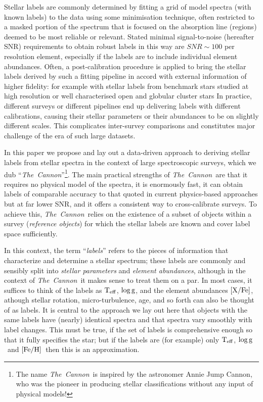 \documentclass[12pt, preprint]{aastex}
\newcommand{\tc}{\textsl{The~Cannon}}
\newcommand{\teff}{\mbox{$\rm T_{eff}$}}
\newcommand{\feh}{\mbox{$\rm [Fe/H]$}}
\newcommand{\xfe}{\mbox{$\rm [X/Fe]$}}
\newcommand{\logg}{\mbox{$\rm \log g$}}
\begin{document}
Stellar labels are commonly determined by fitting a grid of model spectra (with known labels) to the data using some minimisation technique, often restricted to a masked portion of the spectrum that is focused on the absorption line (regions) deemed to be most reliable or relevant. 
Stated minimal signal-to-noise (hereafter SNR) requirements to obtain robust labels in this way are $SNR\sim 100$ per resolution element, especially if the labels are to include individual element abundances. 
Often, a post-calibration procedure is applied to bring the stellar labels derived by such a fitting pipeline in accord with external information of higher fidelity: for example with stellar labels from benchmark stars studied at high resolution or well characterised open and globular cluster stars \citep[e.g.,][]{Meszaros2013, Kord2013}
In practice, different surveys or different pipelines end up delivering labels with different calibrations,
causing their stellar parameters or their abundances to be on slightly different scales.
This complicates inter-survey comparisons and constitutes major challenge of the era of such large datasets. 

In this paper we propose and lay out a data-driven approach to deriving stellar labels from stellar spectra in the context of large spectroscopic surveys,
which we dub ``\tc''\footnote{The name \tc\ is inspired by the astronomer Annie Jump Cannon,
who was the pioneer in producing stellar classifications without any input of physical models!}.
The main practical strengths of \tc\ are that it requires no physical model of the spectra, it is enormously fast, it can obtain labels of comparable accuracy to that quoted in current physics-based approaches
 but at far lower SNR, and it offers a consistent way to cross-calibrate surveys. 
To achieve this, \tc\ relies on the existence of a subset of objects within a survey
(\textit{reference objects}) for which the stellar labels are known and cover label space sufficiently.

In this context, the term ``\emph{labels}'' refers to the pieces of information
that characterize and determine a stellar spectrum; these labels are commonly and sensibly split into \emph{stellar parameters} and \emph{element abundances}, although in the context of \tc\ it makes sense to treat them on a par. 
In most cases, it suffices to think of the labels as \teff , \logg, and the element abundances \xfe, athough stellar rotation, micro-turbulence, age, and so forth can also be thought of as labels.
It is central to the approach we lay out here that objects with the same labels have (nearly) identical spectra and that spectra vary smoothly with label changes. 
This must be true, if the set of labels is comprehensive enough so that it fully specifies the star; but if the labels are (for example) only \teff, \logg\ and \feh\ then this is an approximation.
\end{document}
